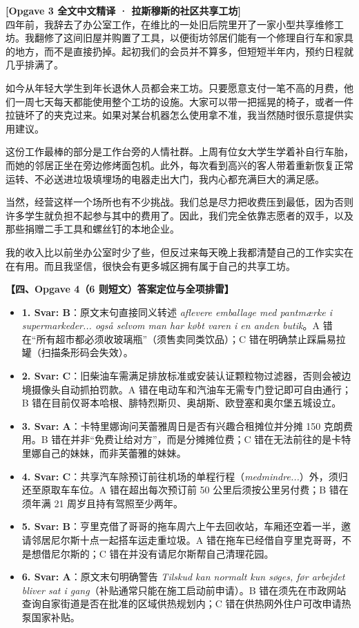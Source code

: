 \begin{transbox}
\small
\textbf{\color{NCDTeal}[Opgave 3 全文中文精译 · 拉斯穆斯的社区共享工坊]}\\
四年前，我辞去了办公室工作，在维比的一处旧后院里开了一家小型共享维修工坊。我翻修了这间旧屋并购置了工具，以便街坊邻居们能有一个修理自行车和家具的地方，而不是直接扔掉。起初我们的会员并不算多，但短短半年内，预约日程就几乎排满了。

如今从年轻大学生到年长退休人员都会来工坊。只要愿意支付一笔不高的月费，他们一周七天每天都能使用整个工坊的设施。大家可以带一把摇晃的椅子，或者一件拉链坏了的夹克过来。如果对某台机器怎么使用拿不准，我当然随时很乐意提供实用建议。

这份工作最棒的部分是工作台旁的人情社群。上周有位女大学生学着补自行车胎，而她的邻居正坐在旁边修烤面包机。此外，每次看到高兴的客人带着重新恢复正常运转、不必送进垃圾填埋场的电器走出大门，我内心都充满巨大的满足感。

当然，经营这样一个场所也有不少挑战。我们总是尽力把收费压到最低，因为否则许多学生就负担不起参与其中的费用了。因此，我们完全依靠志愿者的双手，以及那些捐赠二手工具和螺丝钉的本地企业。

我的收入比以前坐办公室时少了些，但反过来每天晚上我都清楚自己的工作实实在在有用。而且我坚信，很快会有更多城区拥有属于自己的共享工坊。
\end{transbox}

\begin{answerbox}
\textbf{\color{NCDNavy}【四、Opgave 4（6 则短文）答案定位与全项排雷】}
\begin{itemize}
  \item \textbf{1. Svar: B}：原文末句直接同义转述 \textit{aflevere emballage med pantmærke i supermarkeder... også selvom man har købt varen i en anden butik}。A 错在“所有超市都必须收玻璃瓶”（须售卖同类饮品）；C 错在明确禁止踩扁易拉罐（扫描条形码会失效）。
  \item \textbf{2. Svar: C}：旧柴油车需满足排放标准或安装认证颗粒物过滤器，否则会被边境摄像头自动抓拍罚款。A 错在电动车和汽油车无需专门登记即可自由通行；B 错在目前仅哥本哈根、腓特烈斯贝、奥胡斯、欧登塞和奥尔堡五城设立。
  \item \textbf{3. Svar: A}：卡特里娜询问芙蕾雅周日是否有兴趣合租摊位并分摊 150 克朗费用。B 错在并非“免费让给对方”，而是分摊摊位费；C 错在无法前往的是卡特里娜自己的妹妹，而非芙蕾雅的妹妹。
  \item \textbf{4. Svar: C}：共享汽车除预订前往机场的单程行程（\textit{medmindre...}）外，须归还至原取车车位。A 错在超出每次预订前 50 公里后须按公里另付费；B 错在须年满 21 周岁且持有驾照至少两年。
  \item \textbf{5. Svar: B}：亨里克借了哥哥的拖车周六上午去回收站，车厢还空着一半，邀请邻居尼尔斯十点一起搭车运走重垃圾。A 错在拖车已经借自亨里克哥哥，不是想借尼尔斯的；C 错在并没有请尼尔斯帮自己清理花园。
  \item \textbf{6. Svar: A}：原文末句明确警告 \textit{Tilskud kan normalt kun søges, før arbejdet bliver sat i gang}（补贴通常只能在施工启动前申请）。B 错在须先在市政网站查询自家街道是否在批准的区域供热规划内；C 错在供热网外住户可改申请热泵国家补贴。
\end{itemize}
\end{answerbox}

